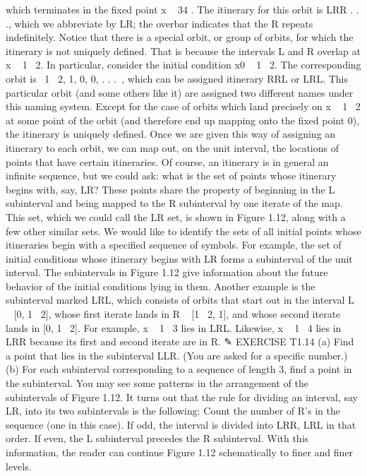 \documentclass{article}
\begin{document}
which terminates in the fixed point x   34
. The itinerary for this orbit is LRR . . .,
which we abbreviate by LR; the overbar indicates that the R repeats indefinitely.
Notice that there is a special orbit, or group of orbits, for which the itinerary
is not uniquely defined. That is because the intervals L and R overlap at x   1  2.
In particular, consider the initial condition x0   1  2. The corresponding orbit
is  1  2, 1, 0, 0, . . . , which can be assigned itinerary RRL or LRL. This particular
orbit (and some others like it) are assigned two different names under this naming
system. Except for the case of orbits which land precisely on x   1  2 at some
point of the orbit (and therefore end up mapping onto the fixed point 0), the
itinerary is uniquely defined.
Once we are given this way of assigning an itinerary to each orbit, we can
map out, on the unit interval, the locations of points that have certain itineraries.
Of course, an itinerary is in general an infinite sequence, but we could ask: what
is the set of points whose itinerary begins with, say, LR? These points share the
property of beginning in the L subinterval and being mapped to the R subinterval
by one iterate of the map. This set, which we could call the LR set, is shown in
Figure 1.12, along with a few other similar sets.
We would like to identify the sets of all initial points whose itineraries begin
with a specified sequence of symbols. For example, the set of initial conditions
whose itinerary begins with LR forms a subinterval of the unit interval. The
subintervals in Figure 1.12 give information about the future behavior of the
initial conditions lying in them. Another example is the subinterval marked LRL,
which consists of orbits that start out in the interval L   [0, 1  2], whose first
iterate lands in R   [1  2, 1], and whose second iterate lands in [0, 1  2]. For
example, x   1  3 lies in LRL. Likewise, x   1  4 lies in LRR because its first and
second iterate are in R.
✎ EXERCISE T1.14
(a) Find a point that lies in the subinterval LLR. (You are asked for a specific
number.) (b) For each subinterval corresponding to a sequence of length 3,
find a point in the subinterval.
You may see some patterns in the arrangement of the subintervals of Figure
1.12. It turns out that the rule for dividing an interval, say LR, into its two
subintervals is the following: Count the number of R’s in the sequence (one in
this case). If odd, the interval is divided into LRR, LRL in that order. If even, the
L subinterval precedes the R subinterval. With this information, the reader can
continue Figure 1.12 schematically to finer and finer levels.
\end{document}
